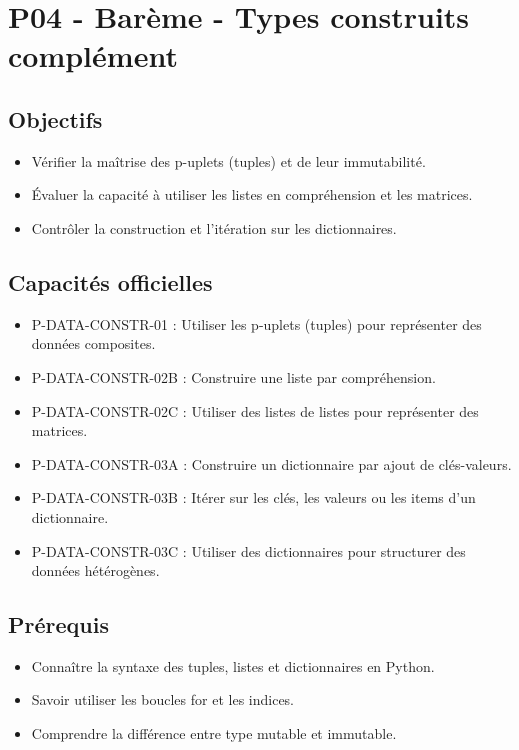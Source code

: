 \section{P04 - Barème - Types construits complément}

\subsection{Objectifs}

\begin{itemize}
\tightlist
\item
  Vérifier la maîtrise des p-uplets (tuples) et de leur immutabilité.
\item
  Évaluer la capacité à utiliser les listes en compréhension et les
  matrices.
\item
  Contrôler la construction et l'itération sur les dictionnaires.
\end{itemize}

\subsection{Capacités officielles}

\begin{itemize}
\tightlist
\item
  P-DATA-CONSTR-01 : Utiliser les p-uplets (tuples) pour représenter des
  données composites.
\item
  P-DATA-CONSTR-02B : Construire une liste par compréhension.
\item
  P-DATA-CONSTR-02C : Utiliser des listes de listes pour représenter des
  matrices.
\item
  P-DATA-CONSTR-03A : Construire un dictionnaire par ajout de
  clés-valeurs.
\item
  P-DATA-CONSTR-03B : Itérer sur les clés, les valeurs ou les items d'un
  dictionnaire.
\item
  P-DATA-CONSTR-03C : Utiliser des dictionnaires pour structurer des
  données hétérogènes.
\end{itemize}

\subsection{Prérequis}

\begin{itemize}
\tightlist
\item
  Connaître la syntaxe des tuples, listes et dictionnaires en Python.
\item
  Savoir utiliser les boucles for et les indices.
\item
  Comprendre la différence entre type mutable et immutable.
\end{itemize}

